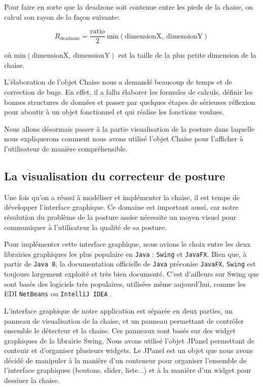 \documentclass{polytech/polytech}
\begin{document}
Pour faire en sorte que la deadzone soit contenue entre les pieds de la chaise, on calcul son rayon de la façon suivante:

$$R_\mathrm{deadzone} = \frac{\mathrm{ratio}}{2}\ \mathrm{min}(\mathrm{dimensionX},\ \mathrm{dimensionY})$$

où $\mathrm{min}(\mathrm{dimensionX},\ \mathrm{dimensionY})$ est la taille de la plus petite dimension de la chaise.

L'élaboration de l'objet Chaise nous a demandé beaucoup de temps et de correction de bugs. En effet, il a fallu élaborer les formules de calculs, définir les bonnes structures de données et passer par quelques étapes de sérieuses réflexion pour aboutir à un objet fonctionnel et qui réalise les fonctions voulues.

Nous allons désormais passer à la partie visualisation de la posture dans laquelle nous expliquerons comment nous avons utilisé l'objet Chaise pour l'afficher à l'utilisateur de manière compréhensible.


\subsection{La visualisation du correcteur de posture}
\label{subsec:visualisation}

Une fois qu'on a réussi à modéliser et implémenter la chaise, il est temps de développer l'interface graphique. Ce domaine est important aussi, car notre résolution du problème de la posture assise nécessite un moyen visuel pour communiquer à l'utilisateur la qualité de sa posture.

Pour implémenter cette interface graphique, nous avions le choix entre les deux librairies graphiques les plus populaire en \texttt{Java} : \texttt{Swing} et \texttt{JavaFX}. Bien que, à partir de \texttt{Java 8}, la documentation officielle de \texttt{Java} préconise \texttt{JavaFX}, \texttt{Swing} est toujours largement exploité et très bien documenté. C'est d'ailleurs sur Swing que sont basés des logiciels très populaires, utilisées même aujourd'hui, comme les EDI \texttt{NetBeans} ou \texttt{IntelliJ IDEA} .

L'interface graphique de notre application est séparée en deux parties, un panneau de visualisation de la chaise, et un panneau permettant de contrôler ensemble le détecteur et la chaise.
Ces panneaux sont basés sur des widget graphiques de la librairie Swing. 
Nous avons utilisé l'objet JPanel permettant de contenir et d'organiser plusieurs widgets.
 Le JPanel est un objet que nous avons décidé de manipuler à la manière d'un conteneur pour organiser l'ensemble de l'interface graphiques (boutons, slider, liste...) et à la manière d'un widget pour dessiner la chaise.
\end{document}

